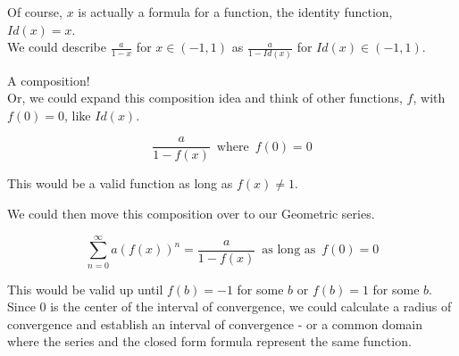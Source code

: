 \documentclass{ximera}
\begin{document}
Of course, $x$ is actually a formula for a function, the identity function, $Id(x) = x$. \\


We could describe $\frac{a}{1-x}$ for $x \in (-1, 1)$ as $\frac{a}{1-Id(x)}$ for $Id(x) \in (-1, 1)$.



 A composition! \\




Or, we could expand this composition idea and think of other functions, $f$, with $f(0) = 0$, like $Id(x)$.



\[    \frac{a}{1-f(x)}   \, \text{ where } \, f(0) = 0       \]


This would be a valid function as long as $f(x) \ne 1$. 




We could then move this composition over to our Geometric series.




\[   \sum_{n=0}^{\infty} a (f(x))^n =  \frac{a}{1-f(x)}   \, \text{ as long as } \, f(0) = 0       \]


This would be valid up until $f(b)=-1$ for some $b$ or $f(b)=1$ for some $b$.  Since $0$ is the center of the interval of convergence, we could calculate a radius of convergence and establish an interval of convergence - or a common domain where the series and the closed form formula represent the same function.
\end{document}
